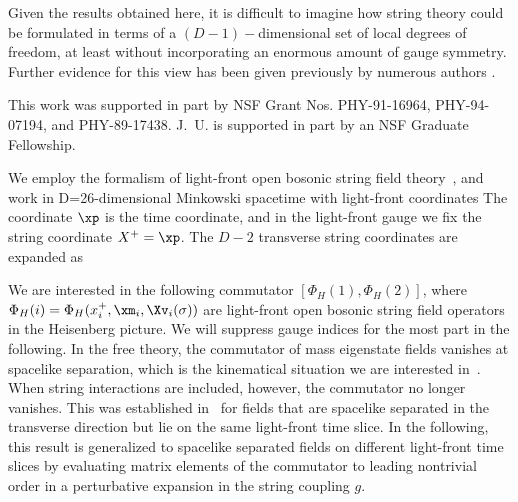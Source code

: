 Given the results obtained here, it is difficult to imagine how
string theory could be formulated in terms of a $(D-1)-$dimensional
set of local degrees of freedom, at least without incorporating an
enormous amount of gauge symmetry.  Further evidence for this view
has been given previously by numerous authors .

\bigskip

\noindent
{}
\hfill\break
This work was supported in part by NSF Grant Nos. PHY-91-16964,
PHY-94-07194, and PHY-89-17438.  J.~U. is supported in part by
an NSF Graduate Fellowship.



We employ the formalism of light-front open bosonic string field
theory~, and work in D=26-dimensional
Minkowski spacetime with light-front coordinates
\eqn{}
The coordinate $\xp$ is the time coordinate, and in the
light-front gauge we fix the string coordinate $X^+ = \xp$.  The
$D-2$
transverse string coordinates are expanded as
\eqn{}

We are interested in the following commutator
$\left [ \Phi_H(1),\Phi_H(2) \right ]$,
where $\Phi_H(i)=\Phi_H(x^+_i,\xm_i,\Xv_i(\sigma))$ are
light-front open bosonic string field operators in the Heisenberg
picture. We will suppress gauge indices for the most part in the
following.
In the free theory, the commutator of mass
eigenstate
fields vanishes at spacelike separation, which is the kinematical
situation we are interested in~.  When string
interactions are included, however, the commutator no longer
vanishes.  This was established in~ for fields that are
spacelike separated in the transverse direction but lie on the same
light-front time slice.  In the following, this result is generalized
to spacelike separated fields on different light-front time slices by
evaluating matrix elements of the commutator to leading nontrivial
order in a perturbative expansion in the string coupling $g$.

